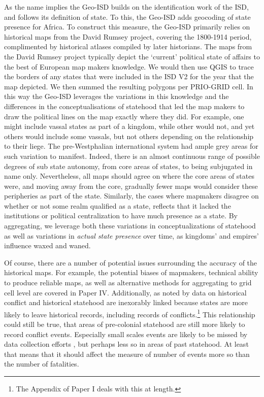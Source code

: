 As the name implies the Geo-ISD builds on the identification work of the ISD,
and follows its definition of state. To this, the Geo-ISD adds geocoding of
state presence for Africa. To construct this measure, the Geo-ISD primarily
relies on historical maps from the David Rumsey project, covering the 1800-1914
period, complimented by historical atlases compiled by later historians. The
maps from the David Rumsey project typically depict the `current' political
state of affairs to the best of European map makers knowledge. We would then use
QGIS to trace the borders of any states that were included in the ISD V2 for the
year that the map depicted. We then summed the resulting polygons per PRIO-GRID
cell. In this way the Geo-ISD leverages the variations in this
knowledge and the differences in the conceptualisations of statehood that led
the map makers to draw the political lines on the map exactly where they did.
For example, one might include vassal states as part of a kingdom, while other
would not, and yet others would include some vassals, but not others depending
on the relationship to their liege. The pre-Westphalian international system had
ample grey areas for such variation to manifest. Indeed, there is an almost
continuous range of possible degrees of sub state autonomy, from core areas of
states, to being subjugated in name only. Nevertheless, all maps should agree on
where the core areas of states were, and moving away from the core, gradually
fewer maps would consider these peripheries as part of the state. Similarly, the
cases where mapmakers disagree on whether or not some realm qualified as a
state, reflects that it lacked the institutions or political centralization to
have much presence as a state. By aggregating, we leverage both these variations
in conceptualizations of statehood as well as variations in \textit{actual state
presence} over time, as kingdoms' and empires' influence waxed and waned.

Of course, there are a number of potential issues surrounding the accuracy of
the historical maps. For example, the potential biases of mapmakers, technical
ability to produce reliable maps, as well as alternative methods for aggregating
to grid cell level are covered in Paper IV. Additionally, as noted by
\citet{Brecke1999} data on historical conflict and historical statehood are
inexorably linked because states are more likely to leave historical records,
including records of conflicts.\footnote{The Appendix of Paper I deals with this
at length.} This relationship could still be true, that areas of pre-colonial
statehood are still more likely to record conflict events. Especially small
scales events are likely to be missed by data collection efforts
\citep{Pinker2012}, but perhaps less so in areas of past statehood.
At least that means that it should affect the measure of number of events more
so than the number of fatalities.

